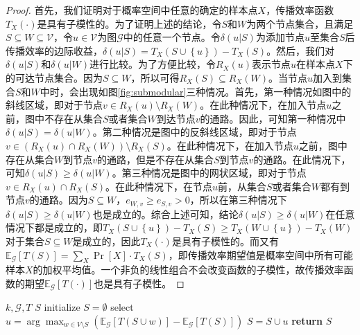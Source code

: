 \begin{proof}\label{pro:submodular}
首先，我们证明对于概率空间中任意的确定的样本点$X$，传播效率函数$T_X\left(\cdot\right)$是具有子模性的。为了证明上述的结论，令$S$和$W$为两个节点集合，且满足$S \subseteq W \subseteq \mathcal{V}$，令$u \in \mathcal{V}$为图$\mathcal{G}$中的任意一个节点。令$\delta\left(u|S\right)$为添加节点$u$至集合$S$后传播效率的边际收益，$\delta\left(u|S\right) = T_X\left(S\cup\left\{u\right\}\right)-T_X\left(S\right)$。然后，我们对$\delta\left(u|S\right)$和$\delta\left(u|W\right)$进行比较。为了方便比较，令$R_X\left(u\right)$表示节点$u$在样本点$X$下的可达节点集合。因为$S \subseteq W$，所以可得$R_X\left(S\right) \subseteq R_X\left(W\right)$。当节点$u$加入到集合$S$和$W$中时，会出现如图\ref{fig:submodular}三种情况。首先，第一种情况如图中的斜线区域，即对于节点$v \in R_X\left(u\right) \setminus R_X\left(W\right)$。在此种情况下，在加入节点$u$之前，图中不存在从集合$S$或者集合$W$到达节点$v$的通路。因此，可知第一种情况中$\delta\left(u|S\right) = \delta\left(u|W\right)$。第二种情况是图中的反斜线区域，即对于节点$v \in \left( R_X\left(u\right) \cap R_X\left(W\right) \right) \setminus R_X\left(S\right)$。在此种情况下，在加入节点$u$之前，图中存在从集合$W$到节点$v$的通路，但是不存在从集合$S$到节点$v$的通路。在此情况下，可知$\delta\left(u|S\right) \geq \delta\left(u|W\right)$。第三种情况是图中的网状区域，即对于节点$v \in R_X\left(u\right) \cap R_X\left(S\right)$。在此种情况下，在节点$u$前，从集合$S$或者集合$W$都有到节点$v$的通路。因为$S \subseteq W$，$e_{W,v} \geq e_{S,v}>0$，所以在第三种情况下$\delta\left(u|S\right) \geq \delta\left(u|W\right)$也是成立的。综合上述可知，结论$\delta\left(u|S\right) \geq \delta\left(u|W\right)$在任意情况下都是成立的，即$T_X\left(S\cup\left\{u\right\}\right)-T_X\left(S\right) \geq T_X\left(W\cup\left\{u\right\}\right)-T_X\left(W\right)$对于集合$S \subseteq W$是成立的，因此$T_X\left(\cdot\right)$是具有子模性的。而又有$\mathbb{E}_\mathcal{G}\left[T\left(S\right)\right] = \sum\nolimits_X{\Pr\left[X\right] \cdot T_X\left(S\right)}$，即传播效率期望值是概率空间中所有可能样本$X$的加权平均值。一个非负的线性组合不会改变函数的子模性，故传播效率函数的期望$\mathbb{E}_\mathcal{G}\left[T\left(\cdot\right)\right]$也是具有子模性。
\end{proof}

\begin{algorithm}[!ht]
\caption{$greedy(k,T)$}
\label{alg:greedy}
\begin{algorithmic}[1]
	\REQUIRE $k,\mathcal{G},T$
    \ENSURE $S$
    \STATE initialize $S=\emptyset$
        \STATE select $u=\arg\max_{w \in V \setminus S}\left({\mathbb{E}_\mathcal{G}\left[T\left(S\cup w\right)\right]-\mathbb{E}_\mathcal{G}\left[T\left(S\right)\right]}\right)$
        \STATE $S=S\cup u$
    \ENDFOR
    \STATE \textbf{return} $S$
\end{algorithmic}
\end{algorithm}

